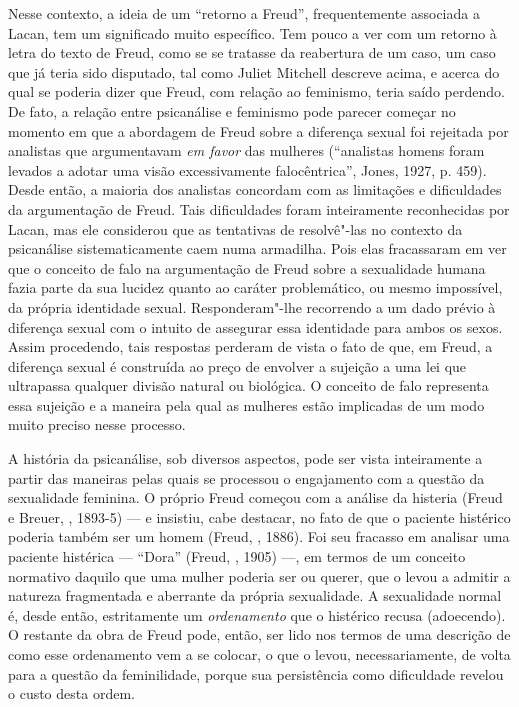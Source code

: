 Nesse contexto, a ideia de um ``retorno a Freud'', frequentemente
associada a Lacan, tem um significado muito específico. Tem pouco a ver
com um retorno à letra do texto de Freud, como se se tratasse da
reabertura de um caso, um caso que já teria sido disputado, tal como
Juliet Mitchell descreve acima, e acerca do qual se poderia dizer que
Freud, com relação ao feminismo, teria saído perdendo. De fato, a
relação entre psicanálise e feminismo pode parecer começar no momento em
que a abordagem de Freud sobre a diferença sexual foi rejeitada por
analistas que argumentavam \emph{em favor} das mulheres (``analistas
homens foram levados a adotar uma visão excessivamente falocêntrica'',
Jones, 1927, p. 459). Desde então, a maioria dos analistas concordam com
as limitações e dificuldades da argumentação de Freud. Tais dificuldades
foram inteiramente reconhecidas por Lacan, mas ele considerou que as
tentativas de resolvê"-las no contexto da psicanálise sistematicamente
caem numa armadilha. Pois elas fracassaram em ver que o conceito de falo
na argumentação de Freud sobre a sexualidade humana fazia parte da sua
lucidez quanto ao caráter problemático, ou mesmo impossível, da própria
identidade sexual. Responderam"-lhe recorrendo a um dado prévio à
diferença sexual com o intuito de assegurar essa identidade para ambos
os sexos. Assim procedendo, tais respostas perderam de vista o fato de
que, em Freud, a diferença sexual é construída ao preço de envolver a
sujeição a uma lei que ultrapassa qualquer divisão natural ou biológica.
O conceito de falo representa essa sujeição e a maneira pela qual as
mulheres estão implicadas de um modo muito preciso nesse processo.

A história da psicanálise, sob diversos aspectos, pode ser vista
inteiramente a partir das maneiras pelas quais se processou o
engajamento com a questão da sexualidade feminina. O próprio Freud
começou com a análise da histeria (Freud e Breuer, , 1893-5) --- e
insistiu, cabe destacar, no fato de que o paciente histérico poderia
também ser um homem (Freud, , 1886). Foi seu fracasso em analisar uma
paciente histérica --- ``Dora'' (Freud, , 1905) ---, em termos de um
conceito normativo daquilo que uma mulher poderia ser ou querer, que o
levou a admitir a natureza fragmentada e aberrante da própria
sexualidade. A sexualidade normal é, desde então, estritamente um
\emph{ordenamento} que o histérico recusa (adoecendo). O restante da
obra de Freud pode, então, ser lido nos termos de uma descrição de como
esse ordenamento vem a se colocar, o que o levou, necessariamente, de
volta para a questão da feminilidade, porque sua persistência como
dificuldade revelou o custo desta ordem.


